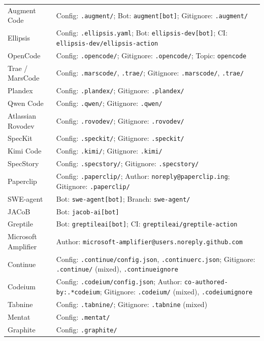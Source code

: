 \documentclass[10pt,a4paper]{article}
\begin{document}
\begin{longtable}{L{2.8cm}L{10.7cm}}
Augment Code &
  Config: \texttt{.augment/};
  Bot: \texttt{augment[bot]};
  Gitignore: \texttt{.augment/} \\
Ellipsis &
  Config: \texttt{.ellipsis.yaml};
  Bot: \texttt{ellipsis-dev[bot]};
  CI: \texttt{ellipsis-dev/ellipsis-action} \\
OpenCode &
  Config: \texttt{.opencode/};
  Gitignore: \texttt{.opencode/};
  Topic: \texttt{opencode} \\
Trae / MarsCode &
  Config: \texttt{.marscode/}, \texttt{.trae/};
  Gitignore: \texttt{.marscode/}, \texttt{.trae/} \\
Plandex &
  Config: \texttt{.plandex/};
  Gitignore: \texttt{.plandex/} \\
Qwen Code &
  Config: \texttt{.qwen/};
  Gitignore: \texttt{.qwen/} \\
Atlassian Rovodev &
  Config: \texttt{.rovodev/};
  Gitignore: \texttt{.rovodev/} \\
SpecKit &
  Config: \texttt{.speckit/};
  Gitignore: \texttt{.speckit/} \\
Kimi Code &
  Config: \texttt{.kimi/};
  Gitignore: \texttt{.kimi/} \\
SpecStory &
  Config: \texttt{.specstory/};
  Gitignore: \texttt{.specstory/} \\
Paperclip &
  Config: \texttt{.paperclip/};
  Author: \texttt{noreply@paperclip.ing};
  Gitignore: \texttt{.paperclip/} \\
SWE-agent &
  Bot: \texttt{swe-agent[bot]};
  Branch: \texttt{swe-agent/} \\
JACoB &
  Bot: \texttt{jacob-ai[bot]} \\
Greptile &
  Bot: \texttt{greptileai[bot]};
  CI: \texttt{greptileai/greptile-action} \\
Microsoft Amplifier &
  Author: \texttt{microsoft-amplifier@users.noreply.github.com} \\
Continue &
  Config: \texttt{.continue/config.json}, \texttt{.continuerc.json};
  Gitignore: \texttt{.continue/} (mixed), \texttt{.continueignore} \\
Codeium &
  Config: \texttt{.codeium/config.json};
  Author: \texttt{co-authored-by:.*codeium};
  Gitignore: \texttt{.codeium/} (mixed), \texttt{.codeiumignore} \\
Tabnine &
  Config: \texttt{.tabnine/};
  Gitignore: \texttt{.tabnine} (mixed) \\
Mentat &
  Config: \texttt{.mentat/} \\
Graphite &
  Config: \texttt{.graphite/} \\

\end{longtable}
\end{document}
